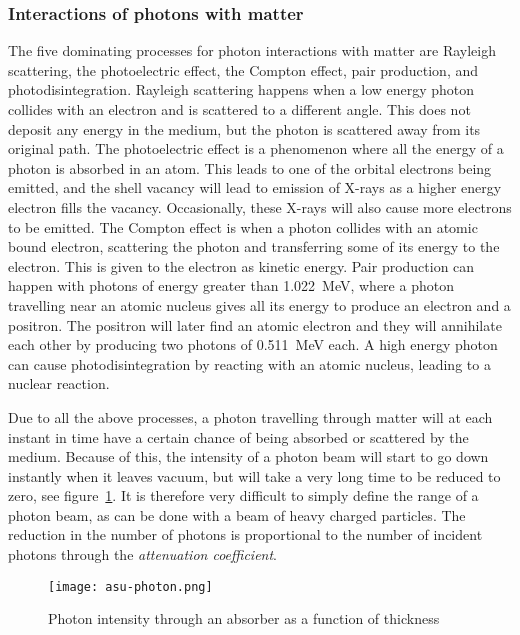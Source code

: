 \documentclass[../main/thesis.tex]{subfiles}
\begin{document}
\subsubsection{Interactions of photons with matter}
\label{t-photon}
The five dominating processes for photon interactions with matter are Rayleigh scattering, the photoelectric effect, the Compton effect, pair production, and photodisintegration. Rayleigh scattering happens when a low energy photon collides with an electron and is scattered to a different angle. This does not deposit any energy in the medium, but the photon is scattered away from its original path. The photoelectric effect is a phenomenon where all the energy of a photon is absorbed in an atom. This leads to one of the orbital electrons being emitted, and the shell vacancy will lead to emission of X-rays as a higher energy electron fills the vacancy. Occasionally, these X-rays will also cause more electrons to be emitted. The Compton effect is when a photon collides with an atomic bound electron, scattering the photon and transferring some of its energy to the electron. This is given to the electron as kinetic energy. Pair production can happen with photons of energy greater than 1.022~MeV, where a photon travelling near an atomic nucleus gives all its energy to produce an electron and a positron. The positron will later find an atomic electron and they will annihilate each other by producing two photons of 0.511~MeV each. A high energy photon can cause photodisintegration by reacting with an atomic nucleus, leading to a nuclear reaction. \citep[chap. 2 $\&$ 5]{Khan} 

Due to all the above processes, a photon travelling through matter will at each instant in time have a certain chance of being absorbed or scattered by the medium. Because of this, the intensity of a photon beam will start to go down instantly when it leaves vacuum, but will take a very long time to be reduced to zero, see figure~\ref{fig-photon}. It is therefore very difficult to simply define the range of a photon beam, as can be done with a beam of heavy charged particles. The reduction in the number of photons is proportional to the number of incident photons through the \textit{attenuation coefficient}. \citep[chap. 5]{Khan} 

\begin{figure}[h]
	\centering
	\texttt{[image: asu-photon.png]}%
	\caption{Photon intensity through an absorber as a function of thickness \citep{asu2000}}
	\label{fig-photon}
\end{figure}
\end{document}

